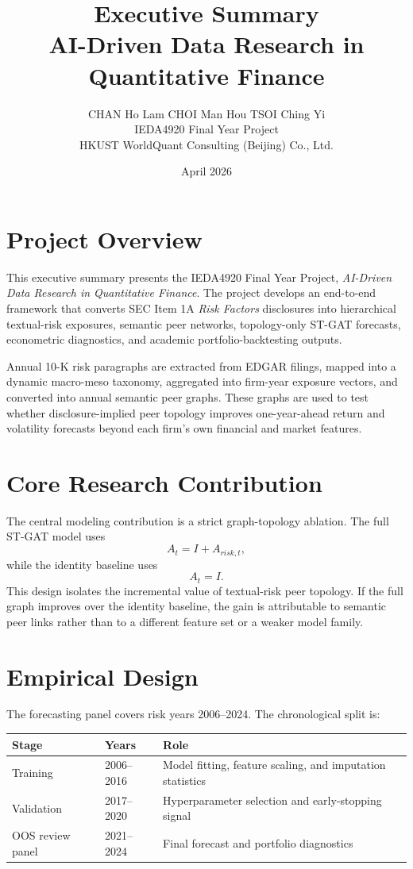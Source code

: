\documentclass[11pt]{article}
\title{\textbf{Executive Summary}\\
\large AI-Driven Data Research in Quantitative Finance}
\author{
CHAN Ho Lam \quad CHOI Man Hou \quad TSOI Ching Yi\\
\small IEDA4920 Final Year Project \\
\small HKUST \quad WorldQuant Consulting (Beijing) Co., Ltd.
}
\date{April 2026}
\begin{document}
\maketitle

\section*{Project Overview}

This executive summary presents the IEDA4920 Final Year Project,
\textit{AI-Driven Data Research in Quantitative Finance}. The project develops
an end-to-end framework that converts SEC Item 1A \textit{Risk Factors}
disclosures into hierarchical textual-risk exposures, semantic peer networks,
topology-only ST-GAT forecasts, econometric diagnostics, and academic
portfolio-backtesting outputs.

Annual 10-K risk paragraphs are extracted from EDGAR filings, mapped into a
dynamic macro-meso taxonomy, aggregated into firm-year exposure vectors, and
converted into annual semantic peer graphs. These graphs are used to test
whether disclosure-implied peer topology improves one-year-ahead return and
volatility forecasts beyond each firm's own financial and market features.

\section*{Core Research Contribution}

The central modeling contribution is a strict graph-topology ablation. The full
ST-GAT model uses
\[
    A_t = I + A_{risk,t},
\]
while the identity baseline uses
\[
    A_t = I.
\]
This design isolates the incremental value of textual-risk peer topology. If
the full graph improves over the identity baseline, the gain is attributable to
semantic peer links rather than to a different feature set or a weaker model
family.

\section*{Empirical Design}

The forecasting panel covers risk years 2006--2024. The chronological split is:

\begin{center}
\begin{tabular}{@{}lll@{}}
\toprule
Stage & Years & Role \\
\midrule
Training & 2006--2016 & Model fitting, feature scaling, and imputation statistics \\
Validation & 2017--2020 & Hyperparameter selection and early-stopping signal \\
OOS review panel & 2021--2024 & Final forecast and portfolio diagnostics \\
\bottomrule
\end{tabular}
\end{center}
\end{document}

